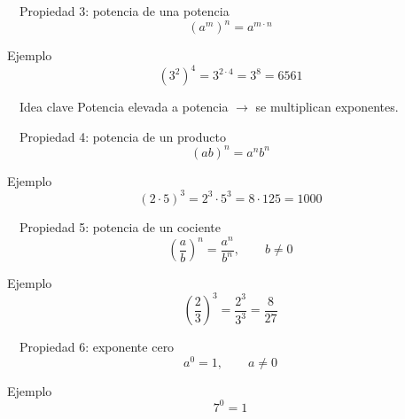 \documentclass[aspectratio=169,10pt,handout]{beamer}
\newcommand{\pp}{\pause}
\newcommand{\iconoDesarrollo}{\faBrain}
\newcommand{\iconoIdea}{\faLightbulb}
\newenvironment{ideaBox}
{\begin{exampleblock}{\iconoIdea\ \ Idea clave}}
	{\end{exampleblock}}
\begin{document}
	\begin{frame}{\iconoDesarrollo\ \ Propiedad 3: potencia de una potencia}
		\[
		(a^m)^n=a^{m\cdot n}
		\]
		
		\pp
		
		\begin{exampleblock}{Ejemplo}
			\[
			(3^2)^4=3^{2\cdot4}=3^8=6561
			\]
		\end{exampleblock}
		
		\pp
		
		\begin{ideaBox}
			Potencia elevada a potencia \(\rightarrow\) se multiplican exponentes.
		\end{ideaBox}
	\end{frame}
	
	\begin{frame}{\iconoDesarrollo\ \ Propiedad 4: potencia de un producto}
		\[
		(ab)^n=a^n b^n
		\]
		
		\pp
		
		\begin{exampleblock}{Ejemplo}
			\[
			(2\cdot5)^3=2^3\cdot5^3=8\cdot125=1000
			\]
		\end{exampleblock}
	\end{frame}
	
	\begin{frame}{\iconoDesarrollo\ \ Propiedad 5: potencia de un cociente}
		\[
		\left(\frac{a}{b}\right)^n=\frac{a^n}{b^n}, \qquad b\neq0
		\]
		
		\pp
		
		\begin{exampleblock}{Ejemplo}
			\[
			\left(\frac{2}{3}\right)^3=\frac{2^3}{3^3}=\frac{8}{27}
			\]
		\end{exampleblock}
	\end{frame}
	
	\begin{frame}{\iconoDesarrollo\ \ Propiedad 6: exponente cero}
		\[
		a^0=1,\qquad a\neq0
		\]
		
		\pp
		
		\begin{exampleblock}{Ejemplo}
			\[
			7^0=1
			\]
		\end{exampleblock}
	\end{frame}
	
\end{document}
